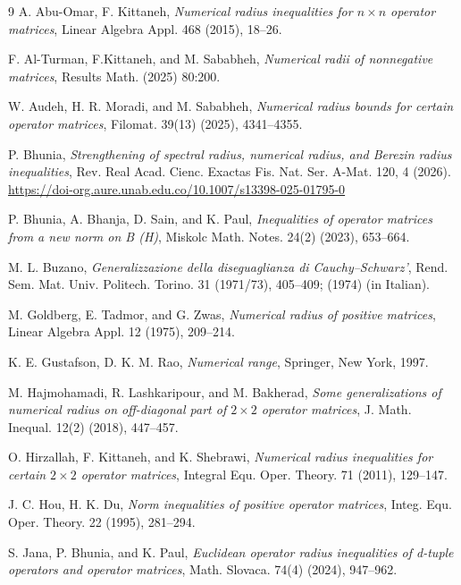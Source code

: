 \documentclass[12pt,twoside,reqno]{amsart}
\numberwithin{equation}{section}
\begin{document}
\begin{thebibliography}{9}
A. Abu-Omar, F. Kittaneh, {\it Numerical radius inequalities for $n\times n$ operator matrices}, Linear Algebra Appl. { 468} (2015), 18--26.

F. Al-Turman, F.Kittaneh, and M. Sababheh, {\it Numerical radii of nonnegative matrices}, Results Math. (2025) 80:200.

W. Audeh, H. R. Moradi, and  M. Sababheh, {\it Numerical radius bounds for certain operator matrices}, Filomat. 39(13) (2025), 4341--4355.


P. Bhunia, {\it Strengthening of spectral radius, numerical radius, and Berezin radius inequalities}, Rev. Real Acad. Cienc. Exactas Fis. Nat. Ser. A-Mat. 120, 4 (2026). \url{https://doi-org.aure.unab.edu.co/10.1007/s13398-025-01795-0}

P. Bhunia, A. Bhanja, D. Sain, and K. Paul, {\it Inequalities of operator matrices from a new norm on B (H)}, Miskolc Math. Notes. 24(2) (2023), 653--664.

M. L. Buzano, {\it Generalizzazione della diseguaglianza di Cauchy--Schwarz'}, Rend. Sem. Mat. Univ. Politech. Torino. {31} (1971/73), 405--409; (1974) (in Italian).



M. Goldberg, E. Tadmor, and G. Zwas, {\it Numerical radius of positive matrices}, Linear Algebra Appl. 12 (1975), 209--214.

K. E. Gustafson, D. K. M. Rao, {\it Numerical range}, Springer, New York, 1997.

 M. Hajmohamadi, R. Lashkaripour, and M. Bakherad, {\it Some generalizations of numerical radius on off-diagonal part of $2\times 2$ operator matrices}, J. Math. Inequal. {12}(2) (2018), 447--457.

O. Hirzallah, F. Kittaneh, and K. Shebrawi, {\it Numerical radius inequalities for certain $2 \times 2$ operator matrices}, Integral Equ. Oper. Theory. {71} (2011), 129--147. 


J. C. Hou, H. K. Du, {\it Norm inequalities of positive operator matrices}, Integ. Equ. Oper. Theory. 22 (1995), 281--294.

S. Jana, P. Bhunia, and K. Paul, {\it Euclidean operator radius inequalities of d-tuple operators and operator matrices}, Math. Slovaca. 74(4) (2024), 947--962.


\end{thebibliography}
\end{document}
